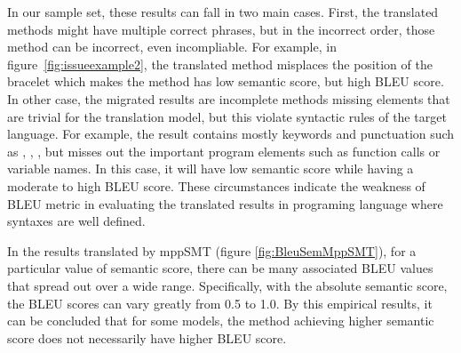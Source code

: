 In our sample set, these results can fall in two main cases. 
First, the translated methods might have multiple correct phrases, but in the 
incorrect order, those method can be incorrect, even incompliable.
%
For example, in figure~\ref{fig:issueexample2}, the translated method
misplaces the position of the bracelet which makes the method has low
semantic score, but high BLEU score. 
%
In other case, the migrated results are incomplete methods missing elements
that are trivial for the translation model, but this violate syntactic rules 
of the target language. For example, the result contains mostly keywords and
punctuation such as , , \code{()}, but misses
out the important program elements such as function calls or variable
names. In this case, it will have low semantic score while having
a moderate to high BLEU score. These circumstances indicate the weakness of BLEU metric 
in evaluating the translated results in programing language where syntaxes are well defined.

In the results translated by mppSMT (figure \ref{fig:BleuSemMppSMT}), 
for a particular value of  semantic score, there can be many associated 
BLEU values that spread out over a wide range. Specifically, 
with the absolute semantic score, the BLEU scores can vary greatly 
from 0.5 to 1.0. By this empirical results, it can be concluded that for 
some models, the method achieving higher semantic score does not necessarily 
have higher BLEU score. 

